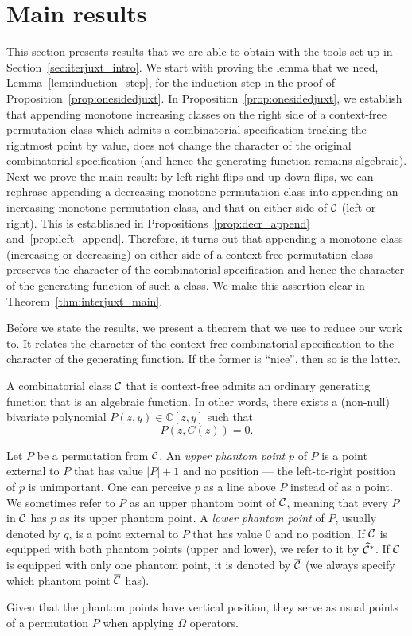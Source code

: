 \documentclass[12pt, a4paper, twoside]{report}
\begin{document}
\section{Main results}
\label{sec:iterjuxt_main}

This section presents results that we are able to obtain with the tools set up in Section~\ref{sec:iterjuxt_intro}. We start with proving the lemma that we need, Lemma~\ref{lem:induction_step}, for the induction step in the proof of Proposition~\ref{prop:onesidedjuxt}. In Proposition~\ref{prop:onesidedjuxt}, we establish that appending monotone increasing classes on the right side of a context-free permutation class which admits a combinatorial specification tracking the rightmost point by value, does not change the character of the original combinatorial specification (and hence the generating function remains algebraic). Next we prove the main result: by left-right flips and up-down flips, we can rephrase appending a decreasing monotone permutation class into appending an increasing monotone permutation class, and that on either side of $\mathcal{C}$ (left or right). This is established in Propositions~\ref{prop:decr_append} and~\ref{prop:left_append}. Therefore, it turns out that appending a monotone class (increasing or decreasing) on either side of a context-free permutation class preserves the character of the combinatorial specification and hence the character of the generating function of such a class. We make this assertion clear in Theorem~\ref{thm:interjuxt_main}. 

Before we state the results, we present a theorem that we use to reduce our work to. It relates the character of the context-free combinatorial specification to the character of the generating function. If the former is ``nice'', then so is the latter.

\begin{theorem}
\label{thm:chomsky}
  A combinatorial class $\mathcal{C}$ that is context-free admits an ordinary generating function that is an algebraic function. In other words, there exists a (non-null) bivariate polynomial $P(z,y) \in \mathbb{C}[z,y]$ such that $$P(z,C(z)) = 0.$$
\end{theorem}

\begin{definition}
Let $P$ be a permutation from $\mathcal{C}$. An \emph{upper phantom point} $p$ of $P$ is a point external to $P$ that has value $|P|+1$ and no position --- the left-to-right position of $p$ is unimportant. One can perceive $p$ as a line above $P$ instead of as a point. We sometimes refer to $P$ as an upper phantom point of $\mathcal{C}$, meaning that every $P$ in $\mathcal{C}$ has $p$ as its upper phantom point. A \emph{lower phantom point} of $P$, usually denoted by $q$, is a point external to $P$ that has value $0$ and no position. If $\mathcal{C}$ is equipped with both phantom points (upper and lower), we refer to it by $\widehat{\mathcal{C}}^*$. If $\mathcal{C}$ is equipped with only one phantom point, it is denoted by $\overline{\mathcal{C}}$ (we always specify which phantom point $\overline{\mathcal{C}}$ has).
\end{definition}
Given that the phantom points have vertical position, they serve as usual points of a permutation $P$ when applying $\Omega$ operators.
\end{document}
